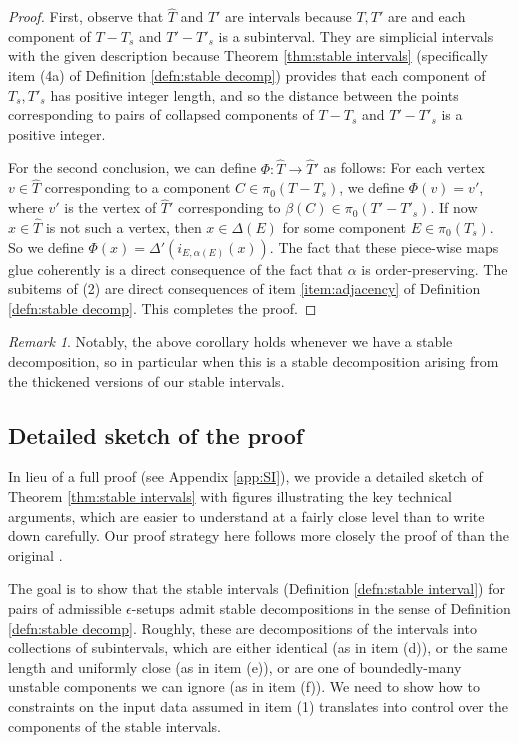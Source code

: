 \documentclass{amsart}
\theoremstyle{definition}
\theoremstyle{remark}
\newtheorem{remark}[theorem]{Remark}
\theoremstyle{definition}
\newcommand{\hT}{\widehat{T}}
\begin{document}
\begin{proof}
First, observe that $\hT$ and $\hT'$ are intervals because $T,T'$ are and each component of $T-T_s$ and $T'-T'_s$ is a subinterval.  They are simplicial intervals with the given description because Theorem \ref{thm:stable intervals} (specifically item (4a) of Definition \ref{defn:stable decomp}) provides that each component of $T_s,T'_s$ has positive integer length, and so the distance between the points corresponding to pairs of collapsed components of $T-T_s$ and $T'-T'_s$ is a positive integer.

For the second conclusion, we can define $\Phi:\hT\to \hT'$ as follows: For each vertex $v \in \hT$ corresponding to a component $C \in \pi_0(T-T_s)$, we define $\Phi(v) = v'$, where $v'$ is the vertex of $\hT'$ corresponding to $\beta(C) \in \pi_0(T'-T'_s)$.  If now $x \in \hT$ is not such a vertex, then $x \in \Delta(E)$ for some component $E \in \pi_0(T_s)$.  So we define $\Phi(x) = \Delta'(i_{E, \alpha(E)}(x))$.  The fact that these piece-wise maps glue coherently is a direct consequence of the fact that $\alpha$ is order-preserving.  The subitems of (2) are direct consequences of item \eqref{item:adjacency} of Definition \ref{defn:stable decomp}.  This completes the proof.
\end{proof}

\begin{remark}
Notably, the above corollary holds whenever we have a stable decomposition, so in particular when this is a stable decomposition arising from the thickened versions of our stable intervals.
\end{remark}

\subsection{Detailed sketch of the proof} \label{subsec:detailed sketch}

In lieu of a full proof (see Appendix \ref{app:SI}), we provide a detailed sketch of Theorem \ref{thm:stable intervals} with figures illustrating the key technical arguments, which are easier to understand at a fairly close level than to write down carefully.  Our proof strategy here follows more closely the proof of \cite[Theorem 10.23]{DMS_FJ} than the original \cite[Theorem 3.1]{DMS_bary}.

The goal is to show that the stable intervals (Definition \ref{defn:stable interval}) for pairs of admissible $\epsilon$-setups admit stable decompositions in the sense of Definition \ref{defn:stable decomp}.  Roughly, these are decompositions of the intervals into collections of subintervals, which are either identical (as in item (d)), or the same length and uniformly close (as in item (e)), or are one of boundedly-many unstable components we can ignore (as in item (f)).  We need to show how to constraints on the input data assumed in item (1) translates into control over the components of the stable intervals.
\end{document}
